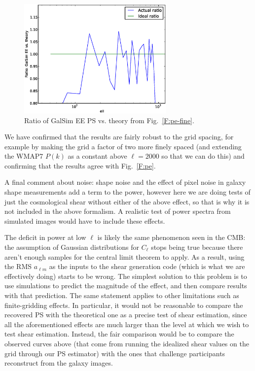 \documentclass[preprint]{aastex}
\begin{document}
\begin{figure}
\begin{center}
\includegraphics[width=3in]{../external/test_gridshear/output/compare_input_pe.fine.ratio.eps}
\caption{Ratio of GalSim EE PS vs. theory from Fig.~\ref{F:pe-fine}.\label{F:pe-fine-ratio}}
\end{center}
\end{figure}

We have confirmed that the results are fairly robust to the grid
spacing, for example by making the grid a factor of two more finely
spaced (and extending the WMAP7 $P(k)$ as a constant above $\ell=2000$
so that we can do this) and confirming that the results agree with
Fig.~\ref{F:pe}.

A final comment about noise: shape noise and the effect of pixel noise
in galaxy shape measurements add a term to the power, however here we
are doing tests of just the cosmological shear without either of the
above effect, so that is why it is not included in the above
formalism.  A realistic test of power spectra from simulated images
would have to include these effects.

The deficit in power at low $\ell$ is likely the same phenomenon  seen
in the CMB: the assumption of Gaussian distributions for $C_\ell$
stops being true because there aren't enough samples for the central
limit theorem to apply.  As a result, using the RMS $a_{\ell m}$ as
the inputs to the shear generation code (which is what we are
effectively doing) starts to be wrong.  The simplest solution to this
problem is to use simulations to predict the magnitude of the effect,
and then compare results with that prediction.  The same statement
applies to other limitations such as finite-gridding effects.  In
particular, it would not be reasonable to compare the recovered PS
with the theoretical one as a precise test of shear estimation, since
all the aforementioned effects are much larger than the level at which
we wish to test shear estimation.  Instead, the fair comparison would
be to compare the observed curves above (that come from running the
idealized shear values on the grid through our PS estimator) with the
ones that challenge participants reconstruct from the galaxy images.
\end{document}
